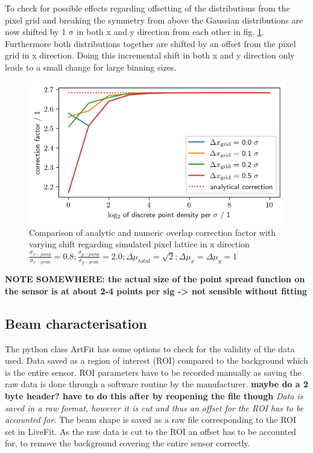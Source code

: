 \documentclass[twoside,openright]{scrreprt}
\begin{document}
{To check for possible effects regarding offsetting of the distributions from the pixel grid and breaking the symmetry from above the Gaussian distributions are now shifted by 1 $\mathrm{\sigma}$ in both x and y direction from each other in fig. \ref{fig:NumericalCorrectionShift}. Furthermore both distributions together are shifted by an offset from the pixel grid in x direction. Doing this incremental shift in both x and y direction only leads to a small change for large binning sizes. 

\begin{figure}[h]
\centering
\includegraphics[width=0.9\linewidth]{images/NumericalCorrectionShiftedBeams.png}
\caption{Comparison of analytic  and numeric overlap correction factor with varying shift regarding simulated pixel lattice in x direction
\\$\frac{\sigma_{x-pump}}{\sigma_{x-probe}}=0.8;\frac{\sigma_{y-pump}}{\sigma_{y-probe}}=2.0;\Delta\mu_{total} = \sqrt{2}; \Delta\mu_x = \Delta\mu_y = 1$\label{fig:NumericalCorrectionShift}}
\end{figure}
\textbf{NOTE SOMEWHERE: the actual size of the point spread function on the sensor is at about 2-4 points per sig -> not sensible without fitting}

\subsection{Beam characterisation}\label{sec:pythonBeamCharacterisation}


The python class ArtFit has some options to check for the validity of the data used. Data saved as a region of interest (ROI) compared to the background which is the entire sensor. ROI parameters have to be recorded manually as saving the raw data is done through a software routine by the manufacturer. \textbf{maybe do a 2 byte header? have to do this after by reopening the file though} \textit{Data is saved in a raw format, however it is cut and thus an offset for the ROI has to be accounted for.} The beam shape is saved as a raw file corresponding to the ROI set in LiveFit. As the raw data is cut to the ROI an offset has to be accounted for, to remove the background covering the entire sensor correctly.

}
\end{document}
